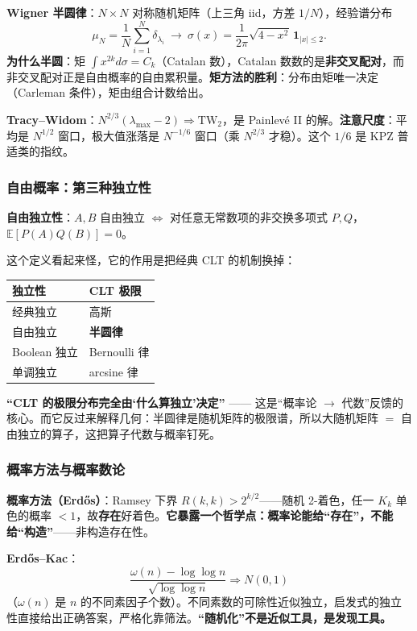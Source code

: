 \textbf{Wigner 半圆律}：$N\times N$ 对称随机矩阵（上三角 iid，方差 $1/N$），经验谱分布
\[
\mu_N=\frac1N\sum_{i=1}^N\delta_{\lambda_i}\ \longrightarrow\
\sigma(x)=\frac{1}{2\pi}\sqrt{4-x^2}\,\mathbf{1}_{|x|\le2}.
\]
\textbf{为什么半圆}：矩 $\int x^{2k}d\sigma=C_k$（Catalan 数），Catalan 数数的是\textbf{非交叉配对}，而非交叉配对正是自由概率的自由累积量。\textbf{矩方法的胜利}：分布由矩唯一决定（Carleman 条件），矩由组合计数给出。

\textbf{Tracy--Widom}：$N^{2/3}(\lambda_{\max}-2)\Rightarrow\mathrm{TW}_2$，是 Painlev\'e II 的解。\textbf{注意尺度}：平均是 $N^{1/2}$ 窗口，极大值涨落是 $N^{-1/6}$ 窗口（乘 $N^{2/3}$ 才稳）。这个 $1/6$ 是 KPZ 普适类的指纹。

\subsubsection{自由概率：第三种独立性}

\textbf{自由独立性}：$A,B$ 自由独立 $\iff$ 对任意无常数项的非交换多项式 $P,Q$，$\mathbb{E}[P(A)Q(B)]=0$。

这个定义看起来怪，它的作用是把经典 CLT 的机制换掉：

\begin{center}
\begin{tabular}{L{4cm}L{8cm}}
\toprule
\textbf{独立性} & \textbf{CLT 极限} \\
\midrule
经典独立 & 高斯 \\
自由独立 & \textbf{半圆律} \\
Boolean 独立 & Bernoulli 律 \\
单调独立 & arcsine 律 \\
\bottomrule
\end{tabular}
\end{center}

\textbf{“CLT 的极限分布完全由‘什么算独立’决定”} —— 这是“概率论 $\to$ 代数”反馈的核心。而它反过来解释几何：半圆律是随机矩阵的极限谱，所以大随机矩阵 $=$ 自由独立的算子，这把算子代数与概率钉死。

\subsubsection{概率方法与概率数论}

\textbf{概率方法（Erd\H{o}s）}：Ramsey 下界 $R(k,k)>2^{k/2}$——随机 2-着色，任一 $K_k$ 单色的概率 $<1$，故\textbf{存在}好着色。\textbf{它暴露一个哲学点：概率论能给“存在”，不能给“构造”}——非构造存在性。

\textbf{Erd\H{o}s--Kac}：
\[
\frac{\omega(n)-\log\log n}{\sqrt{\log\log n}}\Rightarrow N(0,1)
\]
（$\omega(n)$ 是 $n$ 的不同素因子个数）。不同素数的可除性近似独立，启发式的独立性直接给出正确答案，严格化靠筛法。\textbf{“随机化”不是近似工具，是发现工具。}

